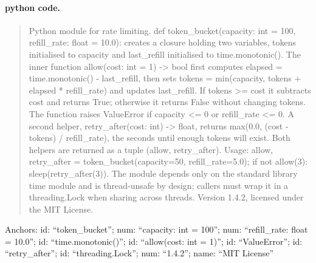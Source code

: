 \paragraph{python code.}
\begin{quote}\small Python module for rate limiting. def token\_bucket(capacity: int = 100, refill\_rate: float = 10.0): creates a closure holding two variables, tokens initialised to capacity and last\_refill initialised to time.monotonic(). The inner function allow(cost: int = 1) -> bool first computes elapsed = time.monotonic() - last\_refill, then sets tokens = min(capacity, tokens + elapsed * refill\_rate) and updates last\_refill. If tokens >= cost it subtracts cost and returns True; otherwise it returns False without changing tokens. The function raises ValueError if capacity <= 0 or refill\_rate <= 0. A second helper, retry\_after(cost: int) -> float, returns max(0.0, (cost - tokens) / refill\_rate), the seconds until enough tokens will exist. Both helpers are returned as a tuple (allow, retry\_after). Usage: allow, retry\_after = token\_bucket(capacity=50, refill\_rate=5.0); if not allow(3): sleep(retry\_after(3)). The module depends only on the standard library time module and is thread-unsafe by design; callers must wrap it in a threading.Lock when sharing across threads. Version 1.4.2, licensed under the MIT License.\end{quote}
\noindent\footnotesize Anchors: id: ``token\_bucket''; num: ``capacity: int = 100''; num: ``refill\_rate: float = 10.0''; id: ``time.monotonic()''; id: ``allow(cost: int = 1)''; id: ``ValueError''; id: ``retry\_after''; id: ``threading.Lock''; num: ``1.4.2''; name: ``MIT License''\normalsize

